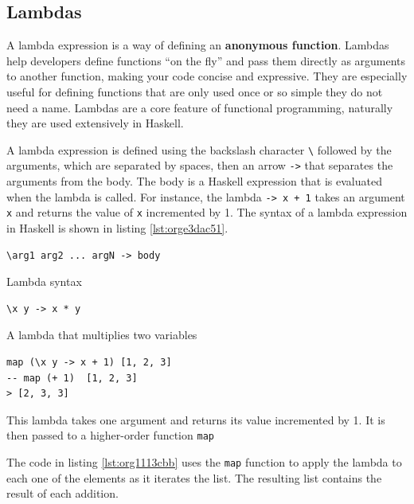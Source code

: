 \documentclass[a4paper, titlepage, twoside]{article}
\begin{document}
\subsection{Lambdas}
\label{sec:org61b70ed}

A lambda expression is a way of defining an \textbf{anonymous function}. Lambdas help developers define functions ``on the fly'' and pass them directly as arguments to another function, making your code concise and expressive. They are especially useful for defining functions that are only used once or so simple they do not need a name. Lambdas are a core feature of functional programming, naturally they are used extensively in Haskell.

A lambda expression is defined using the backslash character \texttt{\textbackslash{}} followed by the arguments, which are separated by spaces, then an arrow \texttt{->} that separates the arguments from the body. The body is a Haskell expression that is evaluated when the lambda is called. For instance, the lambda \texttt{\x -> x + 1} takes an argument \texttt{x} and returns the value of \texttt{x} incremented by 1. The syntax of a lambda expression in Haskell is shown in listing \ref{lst:orge3dac51}.

\begin{listing}[htbp]
\begin{verbatim}
\arg1 arg2 ... argN -> body
\end{verbatim}
\caption{\label{lst:orge3dac51}Lambda syntax}
\end{listing}

\begin{listing}[htbp]
\begin{verbatim}
\x y -> x * y
\end{verbatim}
\caption{A lambda that multiplies two variables}
\end{listing}

\begin{listing}[htbp]
\begin{verbatim}
map (\x y -> x + 1) [1, 2, 3]
-- map (+ 1)  [1, 2, 3]
> [2, 3, 3]
\end{verbatim}
\caption[higher-order lambda]{\label{lst:org1113cbb}This lambda takes one argument and returns its value incremented by 1. It is then passed to a higher-order function \texttt{map}}
\end{listing}

The code in listing \ref{lst:org1113cbb} uses the \texttt{map} function to apply the lambda to each one of the elements as it iterates the list. The resulting list contains the result of each addition.
\end{document}
